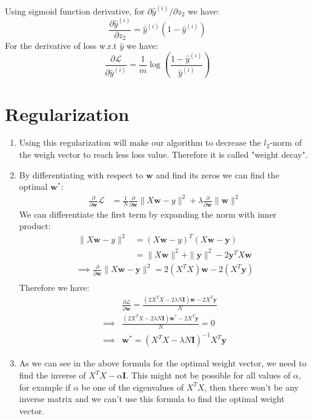 \documentclass[12]{article}
\newcommand{\myskip}{0.7em}
\begin{document}
\begin{enumerate}[label=\textbf{(\alph*)}]
		Using sigmoid function derivative, for $\partial \hat{y}^{(i)} / \partial z_2$ we have:
		\[
		\frac{\partial \hat{y}^{(i)}}{\partial z_2} = \hat{y}^{(i)}(1-\hat{y}^{(i)})
		\]
		For the derivative of loss w.r.t $\hat{y}$ we have:
		\[
		\frac{\partial \mathcal{L}}{\partial \hat{y}^{(i)}} = \frac{1}{m} \log \left(\frac{1-\hat{y}^{(i)}}{\hat{y}^{(i)}}\right)
		\]
		
	\end{enumerate}

	\pagebreak
	\section{Regularization}
	\begin{enumerate}[label=\textbf{(\alph*)}]
		\item
		Using this regularization will make our algorithm to decrease the $l_2$-norm of the weigh vector to reach less loss value. Therefore it is called "weight decay".
		\item
		By differentiating with respect to $\bm{w}$ and find its zeros we can find the optimal $\bm{w}^\ast$:
		\[
		\begin{aligned}
			\frac{\partial}{\partial\bm{w}} \mathcal{L} &= \frac{1}{N} \frac{\partial}{\partial\bm{w}} \|X\bm{w} - y\|^2 + \lambda \frac{\partial}{\partial\bm{w}} \|\bm{w}\|^2
		\end{aligned}
		\]
		We can differentiate the first term by expanding the norm with inner product:
		\[
		\begin{aligned}
			\|X\bm{w}-y\|^2 &= (X\bm{w}-y)^T(X\bm{w}-\bm{y}) \\[\myskip]
				&= \|X\bm{w}\|^2 + \|\bm{y}\|^2 -2\bm{y}^TX\bm{w}
		\end{aligned}
		\]
		\[
		\begin{aligned}
			\implies \frac{\partial}{\partial \bm{w}} \|X\bm{w} - \bm{y}\|^2 = 2(X^TX) \bm{w} - 2(X^T\bm{y}) \\[\myskip]
		\end{aligned}
		\]
		Therefore we have:
		\[
		\begin{aligned}
			& \frac{\partial \mathcal{L}}{\partial \bm{w}} = \frac{(2X^TX - 2\lambda N \bm{I})\bm{w} - 2X^T\bm{y}}{N} \\[1.25em]
			\implies & \frac{(2X^TX - 2\lambda N \bm{I})\bm{w^\ast} - 2X^T\bm{y}}{N} = 0 \\[\myskip]
			\implies &\boxed{\bm{w^\ast} = (X^TX-\lambda N \bm{I})^{-1}X^T\bm{y}}
		\end{aligned}
		\]
		\item
		As we can see in the above formula for the optimal weight vector, we need to find the inverse of $X^TX-\alpha\bm{I}$. This might not be possible for all values of $\alpha$, for example if $\alpha$ be one of the eigenvalues of $X^TX$, then there won't be any inverse matrix and we can't use this formula to find the optimal weight vector.
	\end{enumerate}
\end{document}
